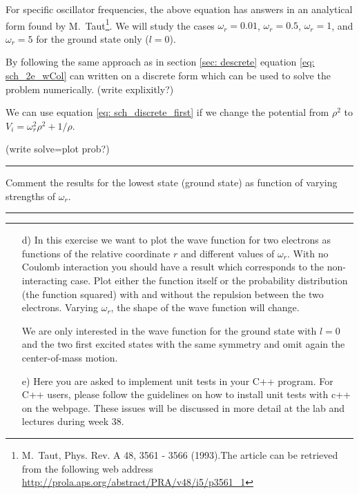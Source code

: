 \documentclass[11pt,a4wide]{article}
\begin{document}
For specific oscillator frequencies, the above equation has answers in an analytical form found by M.~Taut\footnote{M.~Taut, Phys. Rev. A 48, 3561 - 3566 (1993).The article can be retrieved from the following web address \url{http://prola.aps.org/abstract/PRA/v48/i5/p3561_1}}. We will study the cases $\omega_r = 0.01$, $\omega_r = 0.5$, $\omega_r =1$, and $\omega_r = 5$ for the ground state only ($l=0$).

By following the same approach as in section \ref{sec: descrete} equation \ref{eq: sch_2e_wCol} can written on a discrete form which can be used to solve the problem numerically. (write explixitly?)

We can use equation \ref{eq: sch_discrete_first} if we change the potential from $\rho^2$ to $V_i = \omega_r^2\rho^2+1/\rho$. 

(write solve=plot prob?)









\noindent\rule{\textwidth}{1pt}
Comment the results for the lowest state (ground state) as function of
varying strengths of $\omega_r$. 
\noindent\rule{\textwidth}{1pt}


\noindent\rule{\textwidth}{1pt}
\begin{enumerate}

\item[d)] 
In this exercise we want to plot the wave function for two electrons as functions of the relative coordinate $r$ and different values of $\omega_r$.  With no Coulomb interaction you should have a result which corresponds to the non-interacting case. 
Plot either the function itself or the probability distribution (the function squared) with and without the repulsion between the two electrons.
Varying $\omega_r$, the shape of the wave function
will change.  

We are only interested in the wave function for the ground state with $l=0$ and the two first excited states with the same symmetry and
omit again the center-of-mass motion.

\item[e)]  
Here you are asked to implement unit tests in your C++ program. For C++ users, please follow the guidelines on how to install unit tests with c++ on the webpage. These issues will be discussed in more detail at the lab and lectures during week 38. 


\end{enumerate}
\end{document}
